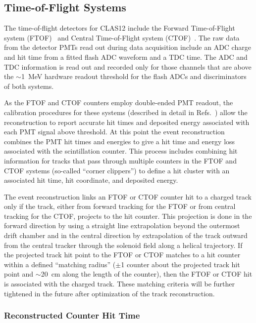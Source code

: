 \subsection{Time-of-Flight Systems}
\label{tof-sys}

The time-of-flight detectors for CLAS12 include the Forward Time-of-Flight system (FTOF)~\cite{ftof-nim}
and Central Time-of-Flight system (CTOF)~\cite{ctof-nim}. The raw data from the detector PMTs read out
during data acquisition include an ADC charge and hit time from a fitted flash ADC waveform and a TDC time.
The ADC and TDC information is read out and recorded only for those channels that are above the $\sim$1~MeV
hardware readout threshold for the flash ADCs and discriminators of both systems.

As the FTOF and CTOF counters employ double-ended PMT readout, the calibration procedures for these
systems (described in detail in Refs.~\cite{ftof-nim,ctof-nim}) allow the reconstruction to report accurate hit
times and deposited energy associated with each PMT signal above threshold. At this point the event
reconstruction combines the PMT hit times and energies to give a hit time and energy loss associated with the
scintillation counter. This process includes combining hit information for tracks that pass through multiple
counters in the FTOF and CTOF systems (so-called ``corner clippers'') to define a hit cluster with an
associated hit time, hit coordinate, and deposited energy.

The event reconstruction links an FTOF or CTOF counter hit to a charged track only if the track, either from
forward tracking for the FTOF or from central tracking for the CTOF, projects to the hit counter. This
projection is done in the forward direction by using a straight line extrapolation beyond the outermost drift
chamber and in the central direction by extrapolation of the track outward from the central tracker through
the solenoid field along a helical trajectory. If the projected track hit point to the FTOF or CTOF matches to
a hit counter within a defined ``matching radius'' ($\pm$1 counter about the projected track hit point and
$\sim$20~cm along the length of the counter),  then the FTOF or CTOF hit is associated with the charged
track. These matching criteria will be further tightened in the future after optimization of the track
reconstruction.

\subsubsection{Reconstructed Counter Hit Time}
\label{rec:time}

